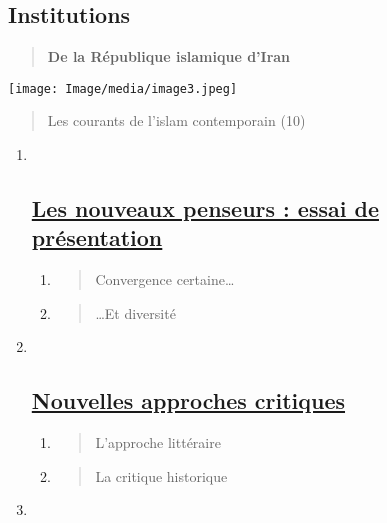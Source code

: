 \hypertarget{institutions}{%
\subsection{Institutions}\label{institutions}}

\begin{quote}
\textbf{De la République islamique d'Iran}
\end{quote}

\texttt{[image: Image/media/image3.jpeg]}

\begin{quote}
Les courants de l'islam contemporain (10)
\end{quote}

\begin{enumerate}
\def\labelenumi{\Roman{enumi}.}
\item ~
  \hypertarget{les-nouveaux-penseurs-essai-de-pruxe9sentation}{%
  \subsection{\texorpdfstring{ \underline{Les nouveaux penseurs : essai
  de
  présentation}}{ Les nouveaux penseurs : essai de présentation}}\label{les-nouveaux-penseurs-essai-de-pruxe9sentation}}

  \begin{enumerate}
  \def\labelenumii{\arabic{enumii}.}
  \item
    \begin{quote}
    Convergence certaine\ldots{}
    \end{quote}
  \item
    \begin{quote}
    \ldots Et diversité
    \end{quote}
  \end{enumerate}
\item ~
  \hypertarget{nouvelles-approches-critiques}{%
  \subsection{\texorpdfstring{ \underline{Nouvelles approches
  critiques}}{ Nouvelles approches critiques}}\label{nouvelles-approches-critiques}}

  \begin{enumerate}
  \def\labelenumii{\arabic{enumii}.}
  \item
    \begin{quote}
    L'approche littéraire
    \end{quote}
  \item
    \begin{quote}
    La critique historique
    \end{quote}
  \end{enumerate}
\item ~
  \hypertarget{le-statut-de-la-parole-de-dieu-un-coran-cruxe9uxe9}{%
}
\end{enumerate}
